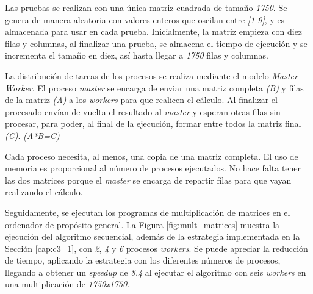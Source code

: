 		Las pruebas se realizan con una única matriz cuadrada de tamaño \textit{1750}. Se genera de manera aleatoria con valores enteros que oscilan entre \textit{[1-9]}, y es almacenada para usar en cada prueba. Inicialmente, la matriz empieza con diez filas y columnas, al finalizar una prueba, se almacena el tiempo de ejecución y se incrementa el tamaño en diez, así hasta llegar a \textit{1750} filas y columnas. 
		
		La distribución de tareas de los procesos se realiza mediante el modelo \textit{Master-Worker}. El proceso \textit{master} se encarga de enviar una matriz completa \textit{(B)} y filas de la matriz \textit{(A)} a los \textit{workers} para que realicen el cálculo. Al finalizar el procesado envían de vuelta el resultado al \textit{master} y esperan otras filas sin procesar, para poder, al final de la ejecución, formar entre todos la matriz final \textit{(C)}. \textit{(A*B=C)}
	
		Cada proceso necesita, al menos, una copia de una matriz completa. El uso de memoria es proporcional al número de procesos ejecutados. No hace falta tener las dos matrices porque el \textit{master} se encarga de repartir filas para que vayan realizando el cálculo.
		
		\vspace*{0.2cm}
	
		Seguidamente, se ejecutan los programas de multiplicación de matrices en el ordenador de propósito general. La Figura \ref{fig:mult_matrices} muestra la ejecución del algoritmo secuencial, además de la estrategia implementada en la Sección \ref{cap:c3_1}, con \textit{2}, \textit{4} y \textit{6} procesos \textit{workers}. Se puede apreciar la reducción de tiempo, aplicando la estrategia con los diferentes números de procesos, llegando a obtener un \textit{speedup} de \textit{8.4} al ejecutar el algoritmo con seis \textit{workers} en una multiplicación de \textit{1750x1750}.
		
